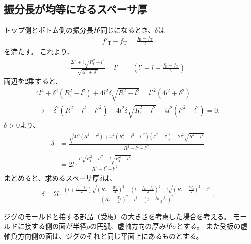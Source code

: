 \subsection{振分長が均等になるスペーサ厚}
トップ側とボトム側の振分長が同じになるとき、$\delta$は
\begin{align*}
  f'_\mathrm T - f_\mathrm T = \frac{f_\mathrm B - f_\mathrm T}2
\end{align*}
を満たす。
これより、
\begin{align*}
  \frac{2l^2+\delta\sqrt{R_\mathrm i^2-l^2}}{\sqrt{4l^2+\delta^2}} = l'\qquad
  \left(l' \equiv l + \frac{f_\mathrm B-f_\mathrm T}2\right)
\end{align*}
両辺を2乗すると、
\begin{gather*}
  4l^4+\delta^2\left(R_\mathrm i^2-l^2\right)+4l^2\delta\sqrt{R_\mathrm i^2-l^2}
  = l'^2\left(4l^2+\delta^2\right)\\
  \longrightarrow\quad
  \delta^2\left(R_\mathrm i^2-l^2-l'^2\right)
  +4l^2\delta\sqrt{R_\mathrm i^2-l^2} -4l^2\left(l'^2 - l^2\right)
  = 0.
\end{gather*}
$\delta > 0$より、
\begin{align*}
  \delta
  &= \frac{\sqrt{4l^4\left(R_\mathrm i^2-l^2\right)
                 +4l^2\left(R_\mathrm i^2-l^2-l'^2\right)\left(l'^2 - l^2\right)}
           -2l^2\sqrt{R_\mathrm i^2-l^2}}{R_\mathrm i^2-l^2-l'^2}\\
  &= 2l\cdot\frac{l'\sqrt{R_\mathrm i^2-l'^2}-l\sqrt{R_\mathrm i^2-l^2}}{R_\mathrm i^2-l^2-l'^2}
\end{align*}
まとめると、求めるスペーサ厚$\delta$は、
\begin{align*}
  \delta
  = 2l\cdot
    \frac{\displaystyle
          \left(l+\frac{f_\mathrm B-f_\mathrm T}2\right)\!
          \sqrt{\left(R_\mathrm c-\frac{W_x}2\right)^{\!\!2}
                -\left(l+\frac{f_\mathrm B-f_\mathrm T}2\right)^{\!\!2}}
          -l\sqrt{\left(R_\mathrm c-\frac{W_x}2\right)^{\!\!2}-l^2}}
         {\displaystyle
          \left(R_\mathrm c-\frac{W_x}2\right)^{\!\!2}-l^2
          -\left(l+\frac{f_\mathrm B-f_\mathrm T}2\right)^{\!\!2}}~.
\end{align*}




\clearpage
ジグのモールドと接する部品（受板）の大きさを考慮した場合を考える。
モールドに接する側の面が半径$\rho$の円弧、虚軸方向の厚みが$\sigma$とする。
また受板の虚軸負方向側の面は、ジグのそれと同じ平面上にあるものとする。

